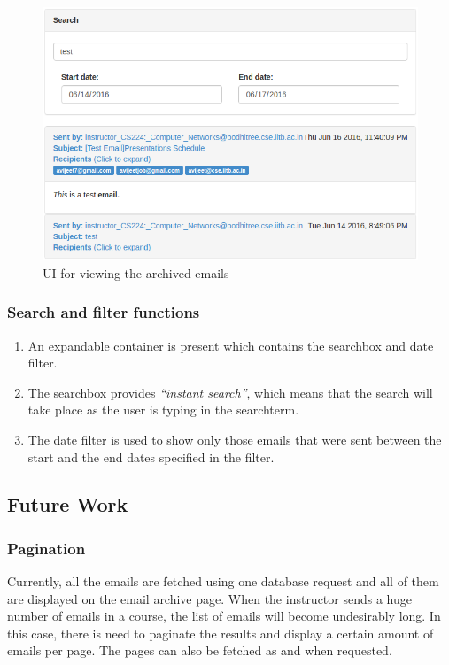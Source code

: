 \begin{figure}[h]
\centering
\includegraphics[width=0.95\linewidth]{./media/email_archive_ui}
\caption{UI for viewing the archived emails}
\label{fig:ea_ui}
\end{figure}

\subsubsection{Search and filter functions}

\begin{enumerate}
	\item An expandable container is present which contains the searchbox and date filter. 
	\item The searchbox provides \textit{``instant search''}, which means that the search will take place as the user is typing in the searchterm.
	\item The date filter is used to show only those emails that were sent between the start and the end dates specified in the filter.
\end{enumerate}

\subsection{Future Work}

\subsubsection{Pagination}

\hspace{0.35cm} Currently, all the emails are fetched using one database request and all of them are displayed on the email archive page. When the instructor sends a huge number of emails in a course, the list of emails will become undesirably long. In this case, there is need to paginate the results and display a certain amount of emails per page. The pages can also be fetched as and when requested.